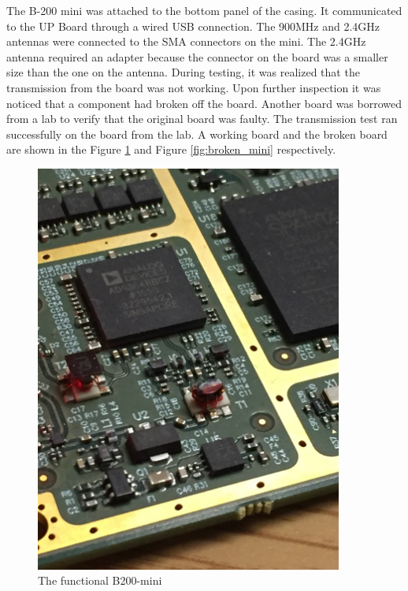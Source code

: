 The B-200 mini was attached to the bottom panel of the casing. It communicated to the UP Board through a wired USB connection. The 900MHz and 2.4GHz antennas were connected to the SMA connectors on the mini. The 2.4GHz antenna required an adapter because the connector on the board was a smaller size than the one on the antenna. During testing, it was realized that the transmission from the board was not working. Upon further inspection it was noticed that a component had broken off the board. Another board was borrowed from a lab to verify that the original board was faulty. The transmission test ran successfully on the board from the lab. A working board and the broken board are shown in the Figure \ref{fig:working_mini} and Figure \ref{fig:broken_mini} respectively.
\begin{figure}[ht!]
\begin{minipage}{.5\textwidth}
  \centering
\includegraphics[width=0.9\textwidth]{img/working_mini.jpg}
\caption{The functional B200-mini}
\label{fig:working_mini}
\end{minipage}
\begin{minipage}{0.5\textwidth}

\end{minipage}
\end{figure}
